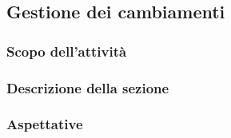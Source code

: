 \subsection{Gestione dei cambiamenti}
\subsubsection{Scopo dell'attività} 
\subsubsection{Descrizione della sezione} 
\subsubsection{Aspettative}